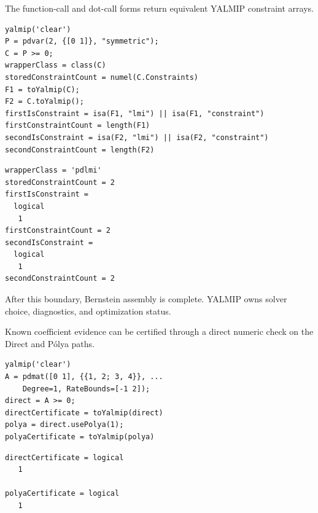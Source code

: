 \examplehead
The function-call and dot-call forms return equivalent YALMIP constraint arrays.

\begin{lstlisting}[style=dpmatlab]
yalmip('clear')
P = pdvar(2, {[0 1]}, "symmetric");
C = P >= 0;
wrapperClass = class(C)
storedConstraintCount = numel(C.Constraints)
F1 = toYalmip(C);
F2 = C.toYalmip();
firstIsConstraint = isa(F1, "lmi") || isa(F1, "constraint")
firstConstraintCount = length(F1)
secondIsConstraint = isa(F2, "lmi") || isa(F2, "constraint")
secondConstraintCount = length(F2)
\end{lstlisting}

\begin{lstlisting}[style=dpoutput]
wrapperClass = 'pdlmi'
storedConstraintCount = 2
firstIsConstraint =
  logical
   1
firstConstraintCount = 2
secondIsConstraint =
  logical
   1
secondConstraintCount = 2
\end{lstlisting}

\begin{center}
\end{center}

After this boundary, Bernstein assembly is complete. YALMIP owns solver choice, diagnostics, and optimization status.

\examplehead
Known coefficient evidence can be certified through a direct numeric check on the Direct and P\'olya paths.

\begin{lstlisting}[style=dpmatlab]
yalmip('clear')
A = pdmat([0 1], {{1, 2; 3, 4}}, ...
    Degree=1, RateBounds=[-1 2]);
direct = A >= 0;
directCertificate = toYalmip(direct)
polya = direct.usePolya(1);
polyaCertificate = toYalmip(polya)
\end{lstlisting}

\begin{lstlisting}[style=dpoutput]
directCertificate = logical
   1

polyaCertificate = logical
   1
\end{lstlisting}

